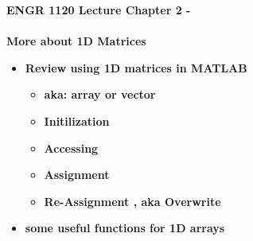 \documentclass[11pt]{article}
\newcommand{\NUM}{2 }
\begin{document}
\textbf{ \LARGE ENGR 1120 Lecture Chapter \NUM - \\\\ More about 1D Matrices} \\

\begin{itemize}

	
	\item \textbf{ \LARGE Review using \color{mypurple} 1D matrices \color{black} in MATLAB }\\
	
		
		\begin{itemize}
			
			\item \textbf{\Large aka: array or vector} \\  \vspace{10mm}
		
			\item \textbf{ \Large Initilization  } \\  \vspace{30mm}
            			
            		\item \textbf{ \Large Accessing } \\  \vspace{30mm}	
            				
            		\item \textbf{ \Large Assignment } \\  \vspace{30mm}			
            				
			\item \textbf{ \Large Re-Assignment , aka Overwrite} \\  \vspace{30mm}			

		\end{itemize}

		\newpage
		\item \textbf{ \LARGE some useful functions for 1D arrays}\\
	

\end{itemize}
\end{document}
